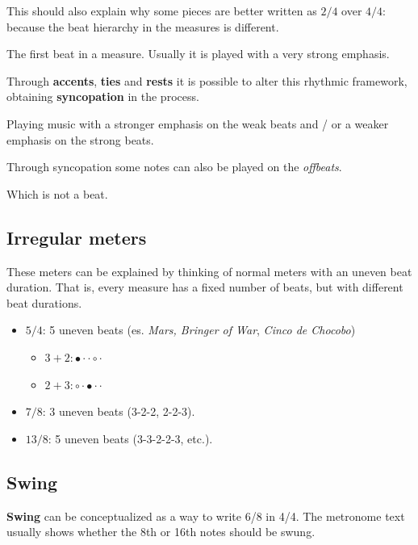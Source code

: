 This should also explain why some pieces are better written as $2/4$ over $4/4$: because the beat hierarchy in the measures is different.

\begin{definition}[Downbeat]
    The first beat in a measure. Usually it is played with a very strong emphasis.
\end{definition}

Through \textbf{accents}, \textbf{ties} and \textbf{rests} it is possible to alter this rhythmic framework, obtaining \textbf{syncopation} in the process.

\begin{definition}[Syncopation]
    Playing music with a stronger emphasis on the weak beats and / or a weaker emphasis on the strong beats.
\end{definition}

Through syncopation some notes can also be played on the \emph{offbeats}.

\begin{definition}[Offbeat]
    Which is not a beat.
\end{definition}

\subsection{Irregular meters}
These meters can be explained by thinking of normal meters with an uneven beat duration. That is, every measure has a fixed number of beats, but with different beat durations.

\begin{itemize}
    \item $5/4$: 5 uneven beats (es. \emph{Mars, Bringer of War}, \emph{Cinco de Chocobo})
    \begin{itemize}
        \item $3+2: \bullet \cdot \cdot \circ \cdot$
        \item $2+3: \circ \cdot \bullet \cdot \cdot$
    \end{itemize}
    \item $7/8$: 3 uneven beats (3-2-2, 2-2-3).
    \item $13/8$: 5 uneven beats (3-3-2-2-3, etc.).
\end{itemize}

\subsection{Swing}
\textbf{Swing} can be conceptualized as a way to write 6/8 in 4/4. The metronome text usually shows whether the 8th or 16th notes should be swung.

